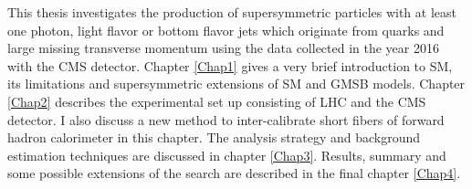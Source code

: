 This thesis investigates the production of supersymmetric particles with at least one photon, light flavor  
or bottom flavor jets which originate from quarks and large 
missing transverse momentum using the data collected in the year 2016 with the CMS detector. Chapter \ref{Chap1} gives a very brief 
introduction to SM, its limitations and supersymmetric extensions of SM and GMSB models. Chapter \ref{Chap2} describes the experimental 
set up consisting of LHC and the CMS detector. I also discuss a new method to inter-calibrate short fibers of forward hadron calorimeter in this chapter.  The 
analysis strategy and background estimation techniques are discussed in chapter \ref{Chap3}. Results, summary and some possible extensions 
of the search are described in the final chapter \ref{Chap4}.